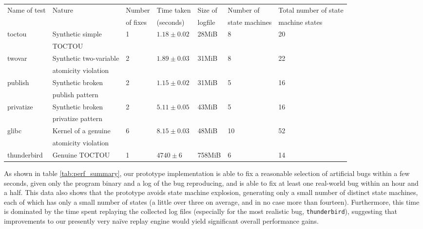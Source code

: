 \documentclass[10pt,twocolumn,preprint,natbib,authoryear]{sigplanconf}
\begin{document}
\begin{table*}
\begin{tabular}{lllllll}
Name of test & Nature & Number & Time taken & Size of & Number of & Total number of state\\
 & & of fixes & (seconds) & logfile & state machines & machine states\\
\hline
toctou & Synthetic simple & 1 & $1.18 \pm 0.02$ & 28MiB & 8 & 20\\
       & TOCTOU & & & \\
twovar & Synthetic two-variable & 2 & $1.89 \pm 0.03$ & 31MiB & 8 & 22\\
       & atomicity violation &&&\\
publish & Synthetic broken & 2 & $1.15 \pm 0.02$ & 31MiB & 5 & 16 \\
        & publish pattern & & & \\
privatize & Synthetic broken & 2 & $5.11 \pm 0.05$ & 43MiB & 5 & 16 \\
          & privatize pattern & & & \\
\hline
glibc & Kernel of a genuine & 6 & $8.15 \pm 0.03$ & 48MiB & 10 & 52\\
      & atomicity violation & & & \\
\hline
thunderbird & Genuine TOCTOU & 1 & $4740 \pm 6$ & 758MiB & 6 & 14
\end{tabular}
\caption{Summary of results obtained from running the fix generating
  tool on a single log file collected from each bug.  Timing
  information is mean and standard deviation from five runs.}
\label{tab:perf_summary}
\end{table*}

As shown in table \ref{tab:perf_summary}, our prototype implementation
is able to fix a reasonable selection of artificial bugs within a few
seconds, given only the program binary and a log of the bug
reproducing, and is able to fix at least one real-world bug within an
hour and a half.  This data also shows that the prototype avoids state
machine explosion, generating only a small number of distinct state
machines, each of which has only a small number of states (a little
over three on average, and in no case more than fourteen).
Furthermore, this time is dominated by the time spent replaying the
collected log files (especially for the most realistic bug,
\verb|thunderbird|), suggesting that improvements to our presently
very na\"ive replay engine would yield significant overall performance
gains.
\end{document}
